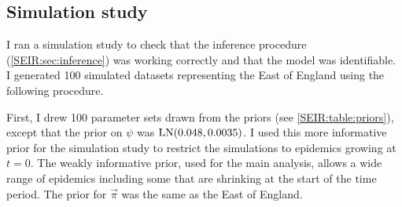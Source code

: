 \documentclass[thesis.tex]{subfiles}
\begin{document}
\subsection{Simulation study} \label{SEIR:sec:sim-study}

I ran a simulation study to check that the inference procedure (\cref{SEIR:sec:inference}) was working correctly and that the model was identifiable.
I generated 100 simulated datasets representing the East of England using the following procedure.

First, I drew 100 parameter sets drawn from the priors (see \cref{SEIR:table:priors}), except that the prior on $\psi$ was $\operatorname{LN}(0.048, 0.0035)$.
I used this more informative prior for the simulation study to restrict the simulations to epidemics growing at $t=0$.
The weakly informative prior, used for the main analysis, allows a wide range of epidemics including some that are shrinking at the start of the time period.
The prior for $\vec{\pi}$ was the same as the East of England.
\end{document}
